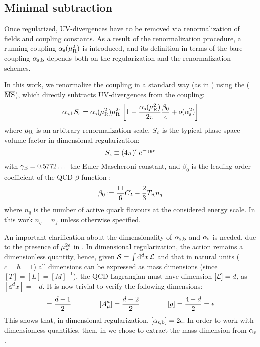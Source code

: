 \subsection{Minimal subtraction}

Once regularized, UV-divergences have to be removed via renormalization of fields and coupling constants. As a result of the renormalization procedure, a running coupling $ \alpha_\text{s}(\mu_\text{R}^2) $ is introduced, and its definition in terms of the bare coupling $ \alpha_\text{s,b} $ depends both on the regularization and the renormalization schemes.

In this work, we renormalize the coupling in a standard way (as in \cite{Catani-1998}) using the  ($ \overline{\text{MS}} $), which directly subtracts UV-divergences from the coupling:
\begin{equation}
  \alpha_\text{s,b} S_\epsilon = \alpha_\text{s}(\mu_\text{R}^2) \mu_\text{R}^{2\epsilon} \left[ 1 - \frac{\alpha_\text{s}(\mu_\text{R}^2)}{2\pi} \frac{\beta_0}{\epsilon} + o(\alpha_\text{s}^2) \right]
  \label{eq:msb-def}
\end{equation}
where $ \mu_\text{R} $ is an arbitrary renormalization scale, $ S_\epsilon $ is the typical phase-space volume factor in dimensional regularization:
\begin{equation}
  S_\epsilon \equiv \left( 4\pi \right)^\epsilon e^{-\gamma_\text{E} \epsilon}
\end{equation}
with $ \gamma_\text{E} = 0.5772\dots $ the Euler-Mascheroni constant, and $ \beta_0 $ is the leading-order coefficient of the QCD $ \beta $-function :
\begin{equation}
  \beta_0 \defeq \frac{11}{6} \caa - \frac{2}{3} \ttr n_q
\end{equation}
where $ n_q $ is the number of active quark flavours at the considered energy scale. In this work $ n_q = n_f $ unless otherwise specified.

An important clarification about the dimensionality of $ \alpha_\text{s,b} $ and $ \alpha_\text{s} $ is needed, due to the presence of $ \mu_\text{R}^{2\epsilon} $ in . In dimensional regularization, the action remains a dimensionless quantity, hence, given $ \mathcal{S} = \int \mathrm{d}^dx \, \mathcal{L} $ and that in natural units ($ c = \hbar = 1 $) all dimensions can be expressed as mass dimensions (since $ [T] = [L] = [M]^{-1} $), the QCD Lagrangian  must have dimension $ [\mathcal{L}] = d $, as $ [\dd^dx] = -d $. It is now trivial to verify the following dimensions:
\begin{equation*}
  [\Psi] = \frac{d - 1}{2}
  \qquad \qquad
  [A_\mu^a] = \frac{d - 2}{2}
  \qquad \qquad
  [g] = \frac{4 - d}{2} = \de
\end{equation*}
This shows that, in dimensional regularization, $ [\alpha_\text{s,b}] = 2\epsilon $. In order to work with dimensionless quantities, then, in  we chose to extract the mass dimension from $ \alpha_\text{s} $.

